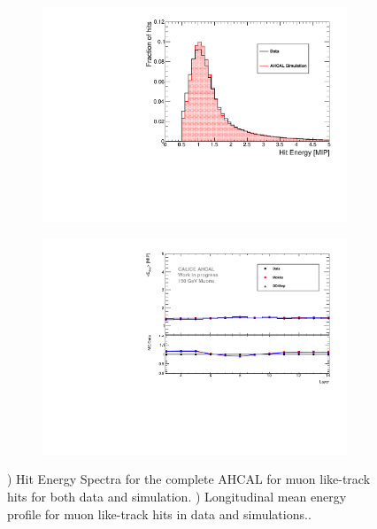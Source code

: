 \documentclass{JINST}
\begin{document}
\begin{figure}[htbp!]
	\centering
	\begin{subfigure}[t]{0.49\textwidth}
		\includegraphics[width=1\linewidth]{fig/ComparisonMCData_MIPPeak.pdf}
		\caption{} \label{fig:MIPData_MC}
	\end{subfigure}
	\hfill
	\begin{subfigure}[t]{0.49\textwidth}
		\includegraphics[width=1\linewidth]{fig/ProfileMuons_Edep.pdf}
		\caption{} \label{fig:ProfileMIP_Edep}
	\end{subfigure}
	\caption{) Hit Energy Spectra for the complete AHCAL for muon like-track hits for both data and simulation. ) Longitudinal mean energy profile for muon like-track hits in data and simulations..}
	\label{fig:Val}
\end{figure}
\end{document}
